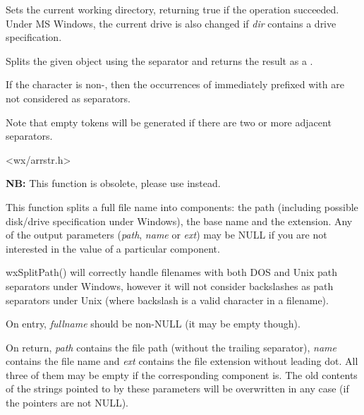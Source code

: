 Sets the current working directory, returning true if the operation succeeded.
Under MS Windows, the current drive is also changed if {\it dir} contains a drive specification.


\label{wxsplit}


Splits the given  object using the separator  and returns the
result as a .

If the  character is non-\NULL, then the occurrences of  immediately prefixed
with  are not considered as separators.

Note that empty tokens will be generated if there are two or more adjacent separators.




<wx/arrstr.h>


\label{wxsplitfunction}


{\bf NB:} This function is obsolete, please use
 instead.

This function splits a full file name into components: the path (including possible disk/drive
specification under Windows), the base name and the extension. Any of the output parameters
({\it path}, {\it name} or {\it ext}) may be NULL if you are not interested in the value of
a particular component.

wxSplitPath() will correctly handle filenames with both DOS and Unix path separators under
Windows, however it will not consider backslashes as path separators under Unix (where backslash
is a valid character in a filename).

On entry, {\it fullname} should be non-NULL (it may be empty though).

On return, {\it path} contains the file path (without the trailing separator), {\it name}
contains the file name and {\it ext} contains the file extension without leading dot. All
three of them may be empty if the corresponding component is. The old contents of the
strings pointed to by these parameters will be overwritten in any case (if the pointers
are not NULL).



